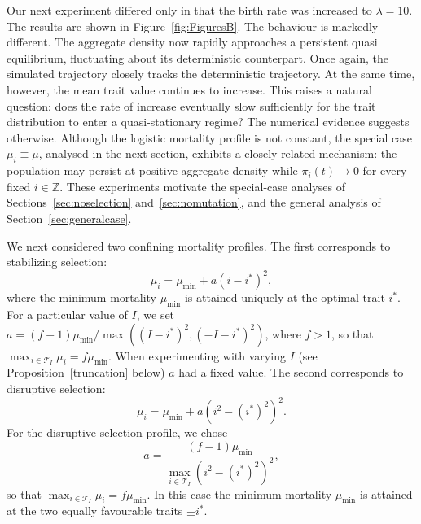 \documentclass[12pt]{article}
\newcommand\T{\ensuremath{\mathcal{T}}}
\newcommand{\Z}{\ensuremath{\mathbb Z}}
\begin{document}
Our next experiment differed only in that the birth rate was increased
to $\lambda=10$. The results are shown in Figure~\ref{fig:FiguresB}. The
behaviour is markedly different. The aggregate density now rapidly
approaches a persistent quasi equilibrium, fluctuating about its
deterministic counterpart. Once again, the simulated trajectory closely
tracks the deterministic trajectory. At the same time, however, the
mean trait value continues to increase. This raises a natural question:
does the rate of increase eventually slow sufficiently for the trait
distribution to enter a quasi-stationary regime? 
The numerical evidence suggests otherwise. Although the logistic
mortality profile is not constant, the special case $\mu_i\equiv\mu$,
analysed in the next section, exhibits a closely related mechanism: the
population may persist at positive aggregate density while
$\pi_i(t)\to 0$ for every fixed $i\in\Z$.
These experiments motivate the special-case analyses of
Sections~\ref{sec:noselection} and~\ref{sec:nomutation}, and the general
analysis of Section~\ref{sec:generalcase}.

We next considered two confining mortality profiles.
The first corresponds to stabilizing selection:
$$
\mu_i=\mu_{\min}+a(i-i^*)^2,
$$
where the minimum mortality $\mu_{\min}$ is attained uniquely at the
optimal trait $i^*$. For a particular value of $I$, we set
$a=(f-1)\mu_{\text{min}}/\max((I-i^*)^2,(-I-i^*)^2)$, where $f>1$,
so that $\max_{i\in \T_I} \mu_i = f\mu_{\text{min}}$. When experimenting with
varying $I$ (see Proposition~\ref{truncation} below) $a$ had a fixed
value. The second corresponds to disruptive selection:
$$
\mu_i=\mu_{\min}+a(i^2-(i^*)^2)^2.
$$
For the disruptive-selection profile, we chose
$$
a=
\frac{(f-1)\mu_{\min}}
{\max_{i\in\T_I}(i^2-(i^*)^2)^2},
$$
so that $\max_{i\in\T_I}\mu_i=f\mu_{\min}$.
In this case the minimum mortality $\mu_{\min}$ is attained at the two
equally favourable traits $\pm i^*$. 
\end{document}
